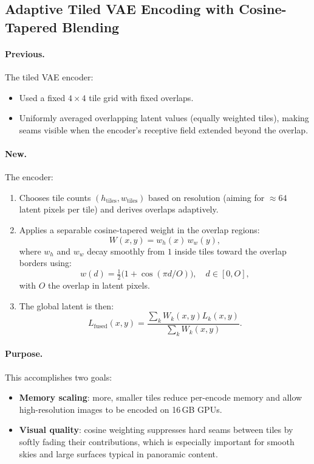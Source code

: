\documentclass[11pt,a4paper]{article}
\begin{document}
\subsection{Adaptive Tiled VAE Encoding with Cosine-Tapered Blending}

\paragraph{Previous.}
The tiled VAE encoder:
\begin{itemize}
    \item Used a fixed \(4\times 4\) tile grid with fixed overlaps.
    \item Uniformly averaged overlapping latent values (equally weighted tiles),
    making seams visible when the encoder's receptive field extended beyond the overlap.
\end{itemize}

\paragraph{New.}
The encoder:
\begin{enumerate}
    \item Chooses tile counts \((h_\text{tiles}, w_\text{tiles})\) based on resolution (aiming for \(\approx64\) latent pixels per tile) and derives overlaps adaptively.
    \item Applies a separable cosine-tapered weight in the overlap regions:
    \begin{equation}
        W(x,y) = w_h(x)\,w_w(y),
    \end{equation}
    where \(w_h\) and \(w_w\) decay smoothly from \(1\) inside tiles toward the overlap borders using:
    \[
        w(d) = \tfrac{1}{2}\bigl(1+\cos(\pi d / O)\bigr), \quad d\in[0,O],
    \]
    with \(O\) the overlap in latent pixels.
    \item The global latent is then:
    \[
        L_{\text{fused}}(x,y) =
        \frac{\sum_k W_k(x,y)L_k(x,y)}{\sum_k W_k(x,y)}.
    \]
\end{enumerate}

\paragraph{Purpose.}
This accomplishes two goals:
\begin{itemize}
    \item \textbf{Memory scaling}: more, smaller tiles reduce per-encode memory and allow high-resolution images to be encoded on 16\,GB GPUs.
    \item \textbf{Visual quality}: cosine weighting suppresses hard seams between tiles by softly fading their contributions, which is especially important for smooth skies and large surfaces typical in panoramic content.
\end{itemize}
\end{document}
